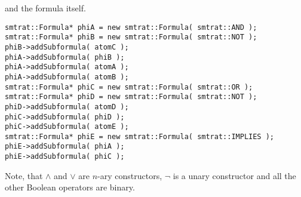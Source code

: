 \normalsize
and the formula itself.
\scriptsize
\begin{verbatim}
smtrat::Formula* phiA = new smtrat::Formula( smtrat::AND );
smtrat::Formula* phiB = new smtrat::Formula( smtrat::NOT );
phiB->addSubformula( atomC );
phiA->addSubformula( phiB );
phiA->addSubformula( atomA );
phiA->addSubformula( atomB );
smtrat::Formula* phiC = new smtrat::Formula( smtrat::OR );
smtrat::Formula* phiD = new smtrat::Formula( smtrat::NOT );
phiD->addSubformula( atomD );
phiC->addSubformula( phiD );
phiC->addSubformula( atomE );
smtrat::Formula* phiE = new smtrat::Formula( smtrat::IMPLIES );
phiE->addSubformula( phiA );
phiE->addSubformula( phiC );
\end{verbatim}
\normalsize
Note, that $\land$ and $\lor$ are $n$-ary constructors, $\neg$ is a unary constructor and all the other Boolean operators are binary.

